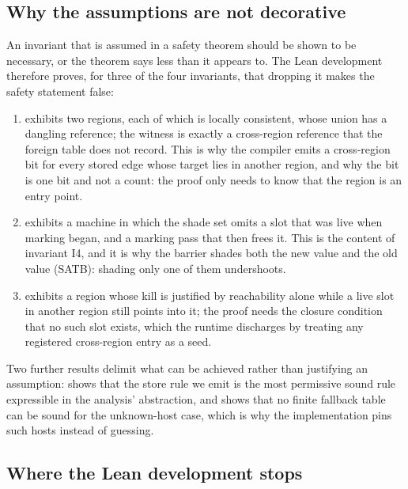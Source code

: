 \subsection{Why the assumptions are not decorative}
\label{sec:appendix:necessity}

An invariant that is assumed in a safety theorem should be shown to be necessary, or the theorem
says less than it appears to.  The Lean development therefore proves, for three of the four
invariants, that dropping it makes the safety statement false:
\begin{enumerate}
\item {} exhibits two regions, each of which is locally
consistent, whose union has a dangling reference; the witness is exactly a cross-region reference
that the foreign table does not record.  This is why the compiler emits a cross-region bit for every
stored edge whose target lies in another region, and why the bit is one bit and not a count: the
proof only needs to know that the region is an entry point.
\item {} exhibits a machine in which the shade set omits a
slot that was live when marking began, and a marking pass that then frees it.  This is the content of
invariant I4, and it is why the barrier shades both the new value and the old value (SATB): shading
only one of them undershoots.
\item {} exhibits a region whose kill is justified
by reachability alone while a live slot in another region still points into it; the proof needs the
closure condition that no such slot exists, which the runtime discharges by treating any registered
cross-region entry as a seed.
\end{enumerate}
Two further results delimit what can be achieved rather than justifying an assumption:
 shows that the store rule we emit is the most
permissive sound rule expressible in the analysis' abstraction, and
 shows that no finite fallback table can be sound for the
unknown-host case, which is why the implementation pins such hosts instead of guessing.

\subsection{Where the Lean development stops}
\label{sec:appendix:gaps}

